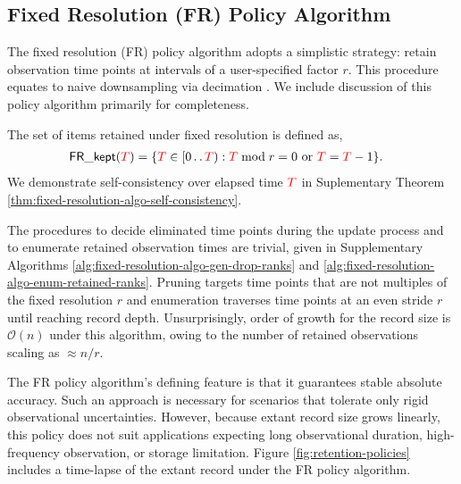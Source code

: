 \subsection{Fixed Resolution (FR) Policy Algorithm}
\label{sec:fixed-resolution-algo}

The fixed resolution (FR) policy algorithm adopts a simplistic strategy: retain observation time points at intervals of a user-specified factor $r$.
This procedure equates to naive downsampling via decimation \citep[p. 31]{crochiere1983multirate}.
We include discussion of this policy algorithm primarily for completeness.

The set of items retained under fixed resolution is defined as,
\begin{align}
\mathsf{FR\_kept}(\colorT)
&= \{
\colorTbar \in [0\twodots\colorT)
: \colorTbar \bmod r = 0 \text{ or } \colorTbar = \colorT - 1
\}.
\label{eqn:fr_kept}
\end{align}
We demonstrate self-consistency over elapsed time $\colorT$ in Suplementary Theorem \ref{thm:fixed-resolution-algo-self-consistency}.

The procedures to decide eliminated time points during the update process and to enumerate retained observation times are trivial, given in Supplementary Algorithms \ref{alg:fixed-resolution-algo-gen-drop-ranks} and \ref{alg:fixed-resolution-algo-enum-retained-ranks}.
Pruning targets time points that are not multiples of the fixed resolution $r$ and enumeration traverses time points at an even stride $r$ until reaching record depth.
Unsurprisingly, order of growth for the record size is $\mathcal{O}(n)$ under this algorithm, owing to the number of retained observations scaling as $\approx n / r$.




% 
% 

The FR policy algorithm's defining feature is that it guarantees stable absolute accuracy.
Such an approach is necessary for scenarios that tolerate only rigid observational uncertainties.
However, because extant record size grows linearly, this policy does not suit applications expecting long observational duration, high-frequency observation, or storage limitation.
Figure \ref{fig:retention-policies} includes a time-lapse of the extant record under the FR policy algorithm.
